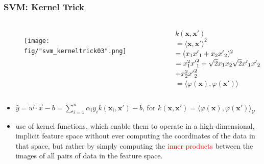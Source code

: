 \documentclass{beamer}
\begin{document}
\begin{frame}
	\frametitle{SVM: Kernel Trick}
	\begin{columns}[c] %
	
	\begin{figure}
		\texttt{[image: fig/"svm\_kerneltrick03".png]}
		
	\end{figure}
	
	$k(\mathbf{x}, \mathbf{x'})$ \\
    $= \langle \mathbf{x},\mathbf{x'} \rangle^2 $ \\
	$= (\mathnormal{x}_1\mathnormal{x'}_1 + \mathnormal{x}_2\mathnormal{x'}_2)^2 $ \\
	$= \mathnormal{x}_1^2\mathnormal{x'}_1^2+ \sqrt{2}{\mathnormal{x}_1\mathnormal{x}_2}\sqrt{2}{\mathnormal{x'}_1\mathnormal{x'}_2} $ \\
	$   + \mathnormal{x}_2^2\mathnormal{x'}_2^2 $ \\
	$= \langle \varphi(\mathbf{x}), \varphi(\mathbf{x'}) \rangle$
    
			
			
	\end{columns}	
	
	\begin{itemize}
		\item $\hat{y} = \vec{w}\cdot\vec{x}-b = \sum_{i=1}^n \alpha_i y_i k(\mathbf{x}_i, \mathbf{x'})-b$, for $k(\mathbf{x}, \mathbf{x'}) = \langle \varphi(\mathbf{x}), \varphi(\mathbf{x'}) \rangle_\mathcal{V}$
		\item use of kernel functions, which enable them to operate in a high-dimensional, implicit feature space without ever computing the coordinates of the data in that space, but rather by simply computing the \textcolor{red}{inner products} between the images of all pairs of data in the feature space. 
	\end{itemize}	
	
\end{frame}
\end{document}

